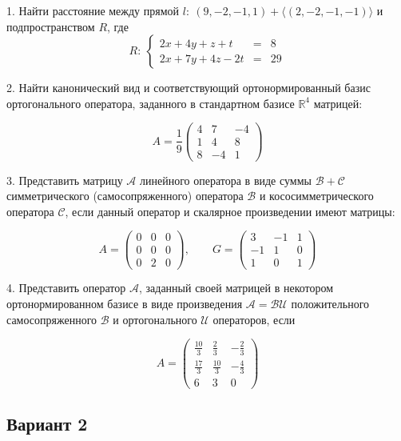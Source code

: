 \documentclass[a4paper]{article}
\begin{document}
1. Найти расстояние между прямой $l:\ (9, -2, -1, 1)+\langle(2,
-2, -1, -1)\rangle$ и подпространством $R$, где
$$
R:\ \left\{
\begin{array}{lcr}
2x+4y+z+t  & = & 8 \\
2x+7y+4z-2t & = & 29

\end{array} \right.
$$

2. Найти канонический вид и соответствующий ортонормированный
базис ортогонального оператора, заданного в стандартном базисе
$\mathbb{R}^4$ матрицей:

$$ A= \frac{1}{9}\left(
\begin{array}{rrr}
4 & 7 & -4 \\
1 & 4 & 8 \\
8 & -4 & 1
\end{array} \right)  $$

3. Представить матрицу $\mathcal{A}$ линейного оператора в виде
суммы $\mathcal{B+C}$ симметрического (самосопряженного) оператора
$\mathcal{B}$ и кососимметрического оператора $\mathcal{C}$, если
данный оператор и скалярное произведении имеют матрицы:

$$ A= \left(
\begin{array}{rrr}
0 & 0 & 0 \\
0 & 0 & 0  \\
0 & 2 & 0
\end{array} \right)  ,\qquad G=
\left(
\begin{array}{rrr}
3&  -1 & 1\\
-1 & 1 & 0 \\
1 & 0 & 1
\end{array} \right)  $$


4. Представить оператор $\mathcal{A}$, заданный своей матрицей в
некотором ортонормированном базисе в виде произведения
$\mathcal{A=BU}$ положительного самосопряженного $\mathcal{B}$ и
ортогонального $\mathcal{U}$ операторов, если

$$ A= \left(
\begin{array}{rrr}
\frac{10}{3} & \frac{2}{3} & -\frac{2}{3}\\
\frac{17}{3} & \frac{10}{3} & -\frac{4}{3} \\
6 & 3 & 0
\end{array} \right)  $$

\subsection{Вариант 2}
\end{document}
